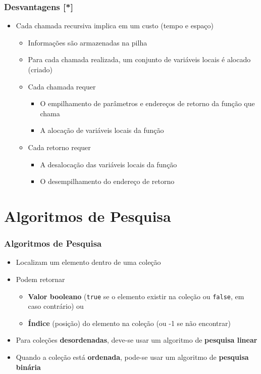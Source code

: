 \documentclass[aspectratio=169]{beamer}
\begin{document}
\begin{frame}\frametitle{Desvantagens [*]}
\begin{itemize}
	\item Cada chamada recursiva implica em um custo (tempo e espaço)
	\begin{itemize}
		\item Informações são armazenadas na pilha
		\item Para cada chamada realizada, um conjunto de variáveis locais é alocado (criado)
		\item Cada chamada requer
		\begin{itemize}
			\item O empilhamento de parâmetros e endereços de retorno da função que chama
			\item A alocação de variáveis locais da função %
		\end{itemize}
		\item Cada retorno requer
		\begin{itemize}
			\item A desalocação das variáveis locais da função %
			\item O desempilhamento do endereço de retorno
		\end{itemize}
	\end{itemize}
\end{itemize}
\end{frame}

\section{Algoritmos de Pesquisa}

\begin{frame}\frametitle{Algoritmos de Pesquisa}
\begin{itemize}
	\item Localizam um elemento dentro de uma coleção
	\item Podem retornar
	\begin{itemize}
		\item \textbf{Valor booleano} (\texttt{true} se o elemento existir na coleção ou \texttt{false}, em caso contrário) ou
		\item \textbf{Índice} (posição) do elemento na coleção (ou -1 se não encontrar)
	\end{itemize}
	\item Para coleções \textbf{desordenadas}, deve-se usar um algoritmo de \textbf{pesquisa linear}
	\item Quando a coleção está \textbf{ordenada}, pode-se usar um algoritmo de \textbf{pesquisa binária}
\end{itemize}
\end{frame}
\end{document}
